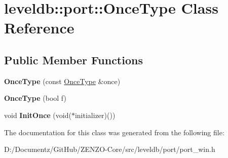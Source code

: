 \hypertarget{classleveldb_1_1port_1_1_once_type}{}\section{leveldb\+::port\+::Once\+Type Class Reference}
\label{classleveldb_1_1port_1_1_once_type}
\subsection*{Public Member Functions}
\begin{DoxyCompactItemize}
\item 
\mbox{\label{classleveldb_1_1port_1_1_once_type_a4864fc816a0b24c6b1fec13e10abd761}} 
{\bfseries Once\+Type} (const \mbox{\hyperlink{classleveldb_1_1port_1_1_once_type}{Once\+Type}} \&once)
\item 
\mbox{\label{classleveldb_1_1port_1_1_once_type_a40a7a521e5cc0fadded8a099a48bfad4}} 
{\bfseries Once\+Type} (bool f)
\item 
\mbox{\label{classleveldb_1_1port_1_1_once_type_a3bda12ab938f0d69dc6a51a741e36b4c}} 
void {\bfseries Init\+Once} (void($\ast$initializer)())
\end{DoxyCompactItemize}


The documentation for this class was generated from the following file\+:\begin{DoxyCompactItemize}
\item 
D\+:/\+Documentz/\+Git\+Hub/\+Z\+E\+N\+Z\+O-\/\+Core/src/leveldb/port/port\+\_\+win.\+h\end{DoxyCompactItemize}
